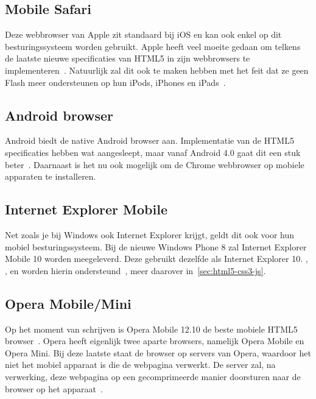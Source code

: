 \subsection{Mobile Safari}
\label{sec:mobile-safari}
Deze webbrowser van Apple zit standaard bij iOS en kan ook enkel op dit besturingssysteem worden gebruikt. Apple heeft veel moeite gedaan om telkens de laatste nieuwe specificaties van HTML5 in zijn webbrowsers te implementeren~\cite{Hales2012}. Natuurlijk zal dit ook te maken hebben met het feit dat ze geen Flash meer ondersteunen op hun iPods, iPhones en iPads~\cite{Jobs2010}.

\subsection{Android browser}
\label{sec:android-browser}
Android biedt de native Android browser aan. Implementatie van de HTML5 specificaties hebben wat aangesleept, maar vanaf Android 4.0 gaat dit een stuk beter~\cite{Hales2012}. Daarnaast is het nu ook mogelijk om de Chrome webbrowser op mobiele apparaten te installeren.

\subsection{Internet Explorer Mobile}
Net zoals je bij Windows ook Internet Explorer krijgt, geldt dit ook voor hun mobiel  besturingssysteem. Bij de nieuwe Windows Phone 8 zal Internet Explorer Mobile 10 worden meegeleverd. Deze gebruikt dezelfde  als Internet Explorer 10. , ,  en  worden hierin ondersteund~\cite{Hales2012}, meer daarover in~\ref{sec:html5-css3-js}.

\subsection{Opera Mobile/Mini}
Op het moment van schrijven is Opera Mobile 12.10 de beste mobiele HTML5 browser~\cite{Sights2012}. Opera heeft eigenlijk twee aparte browsers, namelijk Opera Mobile en Opera Mini. Bij deze laatste staat de browser  op servers van Opera, waardoor het niet het mobiel apparaat is die de webpagina verwerkt. De server zal, na verwerking, deze webpagina op een gecomprimeerde manier doorsturen naar de browser op het apparaat~\cite{PhilDutson2012}.


